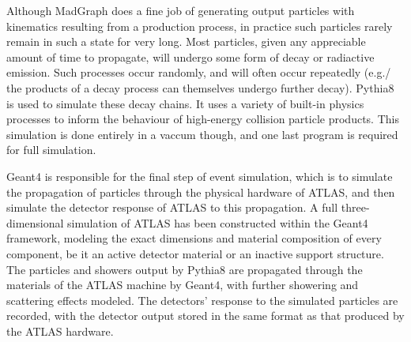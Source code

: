     Although MadGraph does a fine job of generating output particles with kinematics resulting from a production process,
        in practice such particles rarely remain in such a state for very long.
    Most particles, given any appreciable amount of time to propagate, will undergo some form of decay or radiactive emission.
    Such processes occur randomly, and will often occur repeatedly
        (e.g./ the products of a decay process can themselves undergo further decay).
    Pythia8 is used to simulate these decay chains.
    It uses a variety of built-in physics processes to inform the behaviour of high-energy collision particle products.
    This simulation is done entirely in a vaccum though, and one last program is required for full simulation.

    Geant4 is responsible for the final step of event simulation,
        which is to simulate the propagation of particles through the physical hardware of ATLAS,
        and then simulate the detector response of ATLAS to this propagation.
    A full three-dimensional simulation of ATLAS has been constructed within the Geant4 framework,
        modeling the exact dimensions and material composition of every component,
        be it an active detector material or an inactive support structure.
    The particles and showers output by Pythia8 are propagated through the materials of the ATLAS machine by Geant4,
        with further showering and scattering effects modeled.
    The detectors' response to the simulated particles are recorded, with the detector output stored in the same format as that produced by the ATLAS hardware.


